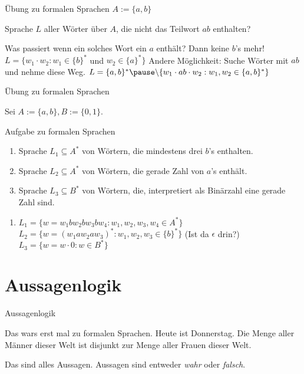 \documentclass[]{beamer}
\begin{document}
\begin{frame}{Übung zu formalen Sprachen}
	$A := \{a, b\}$
	
	\begin{itemize}
		\pitem Sprache $L$ aller Wörter über $A$, die nicht das Teilwort $ab$ enthalten?
		\begin{itemize}
			\pitem Was passiert wenn ein solches Wort ein $a$ enthält? \pause Dann keine $b$'s mehr!
			\pitem $L = \{w_1 \cdot w_2 : w_1 \in \{b\}^*$ und $w_2 \in \{a\}^* \}$
			\pitem Andere Möglichkeit\pause : Suche Wörter mit $ab$ und nehme diese Weg.
			\pitem $L = \{a, b\}^*\pause \backslash\{ w_1 \cdot ab \cdot w_2 : w_1, w_2 \in \{a,b\}^* \}$
		\end{itemize}
	\end{itemize}
\end{frame}

\begin{frame}{Übung zu formalen Sprachen}
	
	Sei $A := \{a, b\}, B := \{0, 1\}$.
	
	\begin{taskblock}{Aufgabe zu formalen Sprachen}
		\begin{enumerate}
			\item Sprache $L_1 \subseteq A^*$ von Wörtern, die mindestens drei $b$'s enthalten.
			\item Sprache $L_2 \subseteq A^*$ von Wörtern, die gerade Zahl von $a$'s enthält.
			\item Sprache $L_3 \subseteq B^*$ von Wörtern, die, interpretiert als Binärzahl eine gerade Zahl sind.
		\end{enumerate}
	\end{taskblock}

	\pause
	
	\begin{enumerate}
		\item $L_1 = \{w = w_1  b  w_2  b  w_3 b w_4 : w_1,w_2,w_3,w_4 \in A^* \}$
		\pitem $L_2 = \{w = (w_1 a w_2 a w_3)^* : w_1,w_2,w_3 \in \{b\}^* \}$ \pause (Ist da $\epsilon$ drin?)
		\pitem $L_3 = \{w = w \cdot 0 : w \in B^* \}$
	\end{enumerate}
\end{frame}

\section{Aussagenlogik}

\begin{frame}{Aussagenlogik}
	\begin{itemize}
		\pitem Das wars erst mal zu formalen Sprachen.
		\pitem Heute ist Donnerstag.
		\pitem Die Menge aller Männer dieser Welt ist disjunkt zur Menge aller Frauen dieser Welt.
	\end{itemize}

	\pause
	
	Das sind alles Aussagen. Aussagen sind entweder \emph{wahr} oder \emph{falsch}.
\end{frame}
\end{document}
